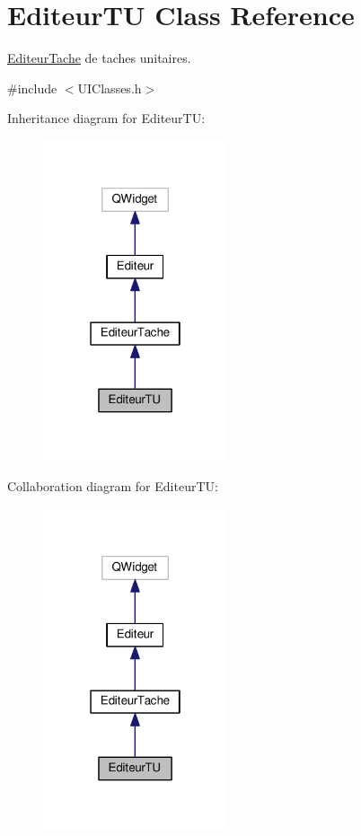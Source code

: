 \hypertarget{class_editeur_t_u}{}\section{Editeur\+T\+U Class Reference}
\label{class_editeur_t_u}


\hyperlink{class_editeur_tache}{Editeur\+Tache} de taches unitaires.  




{\ttfamily \#include $<$U\+I\+Classes.\+h$>$}



Inheritance diagram for Editeur\+T\+U\+:\nopagebreak
\begin{figure}[H]
\begin{center}
\leavevmode
\includegraphics[width=154pt]{class_editeur_t_u__inherit__graph}
\end{center}
\end{figure}


Collaboration diagram for Editeur\+T\+U\+:\nopagebreak
\begin{figure}[H]
\begin{center}
\leavevmode
\includegraphics[width=154pt]{class_editeur_t_u__coll__graph}
\end{center}
\end{figure}
